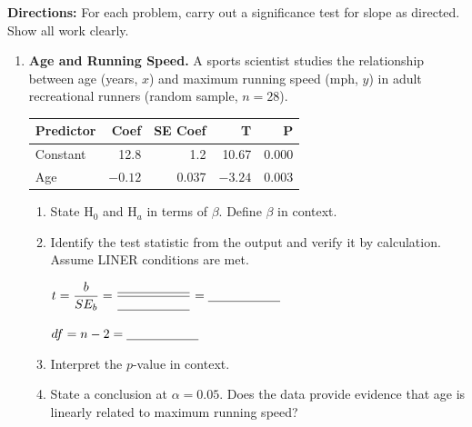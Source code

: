 \documentclass[10pt]{article}
\begin{document}
\namedateperiod

\vspace{0.1in}
\textbf{Directions:} For each problem, carry out a significance test for slope as directed.
Show all work clearly.

\begin{enumerate}

  \item \textbf{Age and Running Speed.} A sports scientist studies the relationship between
        age (years, $x$) and maximum running speed (mph, $y$) in adult recreational runners
        (random sample, $n = 28$).

        \begin{center}
        \renewcommand{\arraystretch}{1.4}
        \begin{tabular}{lrrrr}
            \textbf{Predictor} & \textbf{Coef} & \textbf{SE Coef} & \textbf{T} & \textbf{P} \\
            \hline
            Constant & 12.8 & 1.2   & 10.67 & 0.000 \\
            Age      & $-0.12$ & 0.037 & $-3.24$ & 0.003 \\
        \end{tabular}
        \end{center}

        \begin{enumerate}[label=\alph*.]
          \item State H$_0$ and H$_a$ in terms of $\beta$. Define $\beta$ in context.


          \item Identify the test statistic from the output and verify it by calculation.
                Assume LINER conditions are met.

                $t = \dfrac{b}{SE_b} = \dfrac{\blank{2cm}}{\blank{2cm}} = \blank{2cm}$

                \vspace{0.05in}
                $df = n - 2 = \blank{2cm}$

          \item Interpret the $p$-value in context.

          \item State a conclusion at $\alpha = 0.05$. Does the data provide evidence that
                age is linearly related to maximum running speed?
        \end{enumerate}


\end{enumerate}
\end{document}
